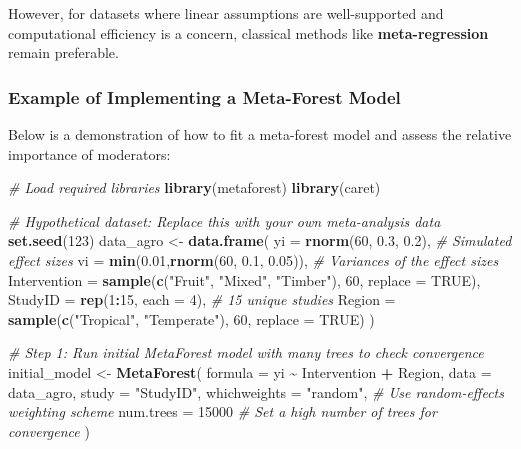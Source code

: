 \documentclass[
]{book}
\newenvironment{Shaded}{\begin{snugshade}}{\end{snugshade}}
\newcommand{\AttributeTok}[1]{\textcolor[rgb]{0.13,0.29,0.53}{#1}}
\newcommand{\CommentTok}[1]{\textcolor[rgb]{0.56,0.35,0.01}{\textit{#1}}}
\newcommand{\ConstantTok}[1]{\textcolor[rgb]{0.56,0.35,0.01}{#1}}
\newcommand{\DecValTok}[1]{\textcolor[rgb]{0.00,0.00,0.81}{#1}}
\newcommand{\FloatTok}[1]{\textcolor[rgb]{0.00,0.00,0.81}{#1}}
\newcommand{\FunctionTok}[1]{\textcolor[rgb]{0.13,0.29,0.53}{\textbf{#1}}}
\newcommand{\NormalTok}[1]{#1}
\newcommand{\OtherTok}[1]{\textcolor[rgb]{0.56,0.35,0.01}{#1}}
\newcommand{\SpecialCharTok}[1]{\textcolor[rgb]{0.81,0.36,0.00}{\textbf{#1}}}
\newcommand{\StringTok}[1]{\textcolor[rgb]{0.31,0.60,0.02}{#1}}
\begin{document}
However, for datasets where linear assumptions are well-supported and computational efficiency is a concern, classical methods like \textbf{meta-regression} remain preferable.

\subsubsection{Example of Implementing a Meta-Forest Model}\label{example-of-implementing-a-meta-forest-model}

Below is a demonstration of how to fit a meta-forest model and assess the relative importance of moderators:

\begin{Shaded}
\begin{Highlighting}[]
\CommentTok{\# Load required libraries}
\FunctionTok{library}\NormalTok{(metaforest)}
\FunctionTok{library}\NormalTok{(caret)}

\CommentTok{\# Hypothetical dataset: Replace this with your own meta{-}analysis data}
\FunctionTok{set.seed}\NormalTok{(}\DecValTok{123}\NormalTok{)}
\NormalTok{data\_agro }\OtherTok{\textless{}{-}} \FunctionTok{data.frame}\NormalTok{(}
  \AttributeTok{yi =} \FunctionTok{rnorm}\NormalTok{(}\DecValTok{60}\NormalTok{, }\FloatTok{0.3}\NormalTok{, }\FloatTok{0.2}\NormalTok{),         }\CommentTok{\# Simulated effect sizes}
  \AttributeTok{vi =} \FunctionTok{min}\NormalTok{(}\FloatTok{0.01}\NormalTok{,}\FunctionTok{rnorm}\NormalTok{(}\DecValTok{60}\NormalTok{, }\FloatTok{0.1}\NormalTok{, }\FloatTok{0.05}\NormalTok{)),        }\CommentTok{\# Variances of the effect sizes}
  \AttributeTok{Intervention =} \FunctionTok{sample}\NormalTok{(}\FunctionTok{c}\NormalTok{(}\StringTok{"Fruit"}\NormalTok{, }\StringTok{"Mixed"}\NormalTok{, }\StringTok{"Timber"}\NormalTok{), }\DecValTok{60}\NormalTok{, }\AttributeTok{replace =} \ConstantTok{TRUE}\NormalTok{),}
  \AttributeTok{StudyID =} \FunctionTok{rep}\NormalTok{(}\DecValTok{1}\SpecialCharTok{:}\DecValTok{15}\NormalTok{, }\AttributeTok{each =} \DecValTok{4}\NormalTok{),    }\CommentTok{\# 15 unique studies}
  \AttributeTok{Region =} \FunctionTok{sample}\NormalTok{(}\FunctionTok{c}\NormalTok{(}\StringTok{"Tropical"}\NormalTok{, }\StringTok{"Temperate"}\NormalTok{), }\DecValTok{60}\NormalTok{, }\AttributeTok{replace =} \ConstantTok{TRUE}\NormalTok{)}
\NormalTok{)}

\CommentTok{\# Step 1: Run initial MetaForest model with many trees to check convergence}
\NormalTok{initial\_model }\OtherTok{\textless{}{-}} \FunctionTok{MetaForest}\NormalTok{(}
  \AttributeTok{formula =}\NormalTok{ yi }\SpecialCharTok{\textasciitilde{}}\NormalTok{ Intervention }\SpecialCharTok{+}\NormalTok{ Region,}
  \AttributeTok{data =}\NormalTok{ data\_agro,}
  \AttributeTok{study =} \StringTok{"StudyID"}\NormalTok{,}
  \AttributeTok{whichweights =} \StringTok{"random"}\NormalTok{,          }\CommentTok{\# Use random{-}effects weighting scheme}
  \AttributeTok{num.trees =} \DecValTok{15000}                 \CommentTok{\# Set a high number of trees for convergence}
\NormalTok{)}


\end{Highlighting}
\end{Shaded}
\end{document}
